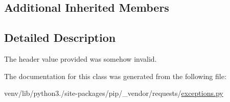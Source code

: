 \subsection*{Additional Inherited Members}


\subsection{Detailed Description}
\begin{DoxyVerb}The header value provided was somehow invalid.\end{DoxyVerb}
 

The documentation for this class was generated from the following file\+:\begin{DoxyCompactItemize}
\item 
venv/lib/python3./site-\/packages/pip/\+\_\+vendor/requests/\hyperlink{pip_2__vendor_2requests_2exceptions_8py}{exceptions.\+py}\end{DoxyCompactItemize}
